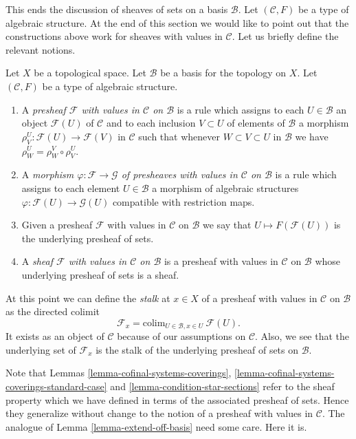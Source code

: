 \medskip\noindent
This ends the discussion of sheaves of sets on
a basis $\mathcal{B}$. Let $(\mathcal{C}, F)$ be
a type of algebraic structure. At the end of this section
we would like to point out that the constructions
above work for sheaves with values in $\mathcal{C}$.
Let us briefly define the relevant notions.

\begin{definition}
\label{definition-sheaf-structures-basis}
Let $X$ be a topological space. Let $\mathcal{B}$ be a
basis for the topology on $X$. Let $(\mathcal{C}, F)$ be
a type of algebraic structure.
\begin{enumerate}
\item A {\it presheaf $\mathcal{F}$ with values in $\mathcal{C}$
on $\mathcal{B}$} is a rule which assigns to each
$U \in \mathcal{B}$ an object
$\mathcal{F}(U)$ of $\mathcal{C}$ and to each inclusion $V \subset U$
of elements of $\mathcal{B}$ a morphism
$\rho^U_V : \mathcal{F}(U) \to \mathcal{F}(V)$  in $\mathcal{C}$ such that
whenever $W \subset V \subset U$ in $\mathcal{B}$ we have
$\rho^U_W = \rho^V_W \circ \rho ^U_V$.
\item A {\it morphism $\varphi : \mathcal{F} \to \mathcal{G}$
of presheaves with values in $\mathcal{C}$
on $\mathcal{B}$} is a rule which assigns to each
element $U \in \mathcal{B}$ a morphism of
algebraic structures $\varphi : \mathcal{F}(U) \to \mathcal{G}(U)$
compatible with restriction maps.
\item Given a presheaf $\mathcal{F}$ with values in $\mathcal{C}$
on $\mathcal{B}$ we say that $U \mapsto F(\mathcal{F}(U))$ is the
underlying presheaf of sets.
\item A {\it sheaf $\mathcal{F}$ with values in $\mathcal{C}$
on $\mathcal{B}$} is a presheaf with values in $\mathcal{C}$
on $\mathcal{B}$ whose underlying presheaf of sets is a sheaf.
\end{enumerate}
\end{definition}

\noindent
At this point we can define the {\it stalk} at $x \in X$
of a presheaf with values in $\mathcal{C}$ on $\mathcal{B}$
as the directed colimit
$$
\mathcal{F}_x = \text{colim}_{U\in \mathcal{B}, x\in U}\ \mathcal{F}(U).
$$
It exists as an object of $\mathcal{C}$
because of our assumptions on $\mathcal{C}$.
Also, we see that the underlying set of $\mathcal{F}_x$
is the stalk of the underlying presheaf of sets on $\mathcal{B}$.

\medskip\noindent
Note that Lemmas \ref{lemma-cofinal-systems-coverings},
\ref{lemma-cofinal-systems-coverings-standard-case} and
\ref{lemma-condition-star-sections} refer to the sheaf
property which we have defined in terms of the associated presheaf
of sets. Hence they generalize without change to the notion
of a presheaf with values in $\mathcal{C}$. The analogue of
Lemma \ref{lemma-extend-off-basis} need some care. Here it is.

